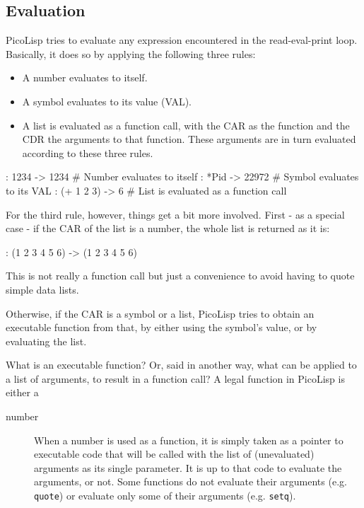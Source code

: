 
\subsection{Evaluation}
\label{sec:refm-evaluation}


PicoLisp tries to evaluate any expression encountered in the
read-eval-print loop. Basically, it does so by applying the following
three rules:

\begin{itemize}
\item A number evaluates to itself.
\item A symbol evaluates to its value (VAL).
\item A list is evaluated as a function call, with the CAR as the function
   and the CDR the arguments to that function. These arguments are in
   turn evaluated according to these three rules.
\end{itemize}


\begin{wideverbatim}
: 1234
-> 1234        # Number evaluates to itself
: *Pid
-> 22972       # Symbol evaluates to its VAL
: (+ 1 2 3)
-> 6           # List is evaluated as a function call
\end{wideverbatim}

For the third rule, however, things get a bit more involved. First - as
a special case - if the CAR of the list is a number, the whole list is
returned as it is:


\begin{wideverbatim}
: (1 2 3 4 5 6)
-> (1 2 3 4 5 6)
\end{wideverbatim}

This is not really a function call but just a convenience to avoid
having to quote simple data lists.

Otherwise, if the CAR is a symbol or a list, PicoLisp tries to obtain an
executable function from that, by either using the symbol's value, or by
evaluating the list.

What is an executable function? Or, said in another way, what can be
applied to a list of arguments, to result in a function call? A legal
function in PicoLisp is either a

\begin{description}
\item[number] When a number is used as a function, it is simply taken as a
pointer to executable code that will be called with the list of
(unevaluated) arguments as its single parameter. It is up to that code
to evaluate the arguments, or not. Some functions do not evaluate their
arguments (e.g. \texttt{quote}) or evaluate only some of their arguments (e.g.
\texttt{setq}). 
\end{description}

